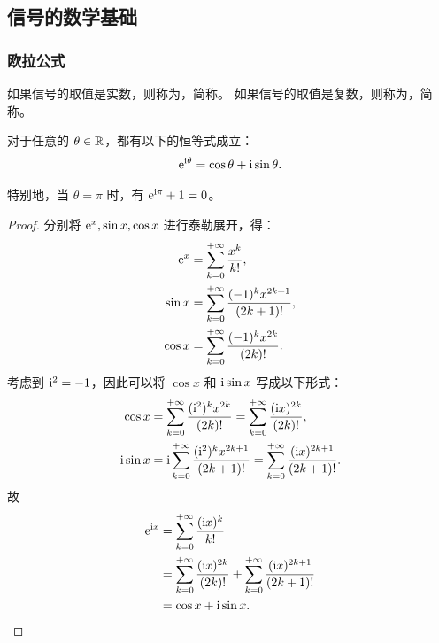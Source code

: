 \subsection{信号的数学基础}

\subsubsection{欧拉公式}

\begin{definition}[实值信号与复值信号]
    如果信号的取值是实数，则称为，简称。
    如果信号的取值是复数，则称为，简称。
\end{definition}

\begin{theorem}[欧拉公式]
    对于任意的 $\theta \in \mathbb{R}$，都有以下的恒等式成立：
    \begin{align*}
        \mathrm{e}^{\mathrm{i} \theta} = \cos \theta + \mathrm{i} \sin\theta.
    \end{align*}

    特别地，当 $\theta = \pi$ 时，有 $\mathrm{e}^{\mathrm{i}\pi} + 1 = 0$。
\end{theorem}

\begin{proof}
     分别将 $\mathrm{e}^x, \sin x, \cos x$ 进行泰勒展开，得：
    \begin{align*}
        \mathrm{e}^x &= \sum_{k = 0}^{+\infty}\frac{x^k}{k!}, \\
        \sin x   &= \sum_{k = 0}^{+\infty}\frac{(-1)^kx^{2k + 1}}{(2k + 1)!}, \\
        \cos x   &= \sum_{k = 0}^{+\infty}\frac{(-1)^kx^{2k}}{(2k)!}.
    \end{align*}
    考虑到 $\mathrm{i}^2 = -1$，因此可以将 $\cos x$ 和 $\mathrm{i}\sin x$ 写成以下形式：
    \begin{align*}
        \cos x &= \sum_{k = 0}^{+\infty}\frac{(\mathrm{i}^2)^kx^{2k}}{(2k)!}
                = \sum_{k = 0}^{+\infty}\frac{(\mathrm{i} x)^{2k}}{(2k)!}, \\
        \mathrm{i}\sin x &= \mathrm{i}\sum_{k = 0}^{+\infty}\frac{(\mathrm{i}^2)^kx^{2k + 1}}{(2k + 1)!}
                = \sum_{k = 0}^{+\infty}\frac{(\mathrm{i} x)^{2k + 1}}{(2k + 1)!}.
    \end{align*}
    故
    \begin{align*}
        \mathrm{e}^{\mathrm{i} x} & = \sum_{k = 0}^{+\infty}\frac{(\mathrm{i} x)^k}{k!} \\
        & = \sum_{k = 0}^{+\infty}\frac{(\mathrm{i} x)^{2k}}{(2k)!} + 
            \sum_{k = 0}^{+\infty}\frac{(\mathrm{i} x)^{2k + 1}}{(2k + 1)!} \\
        & = \cos x + \mathrm{i} \sin x.
    \end{align*}
\end{proof}

